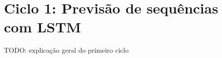 \chapter{Ciclo 1: Previsão de sequências com LSTM}
\label{chap:lstm}

TODO: explicação geral do primeiro ciclo